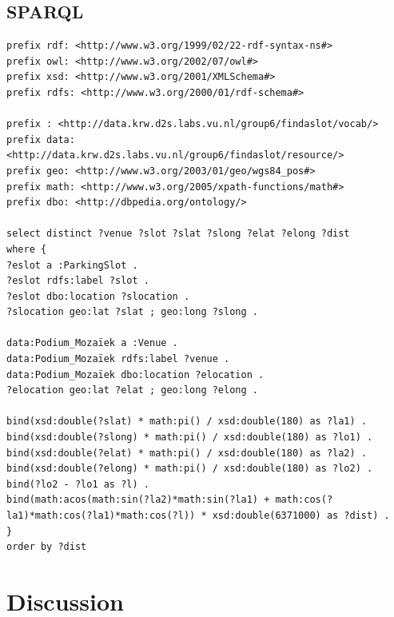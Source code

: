 \documentclass[runningheads,a4paper]{../../StyleFiles/llncs}
\begin{document}

\subsection{SPARQL}

\begin{lstlisting}[captionpos=b, caption=SPARQL query, label=lst:sparql,
basicstyle=\ttfamily,frame=bt]
prefix rdf: <http://www.w3.org/1999/02/22-rdf-syntax-ns#>
prefix owl: <http://www.w3.org/2002/07/owl#>
prefix xsd: <http://www.w3.org/2001/XMLSchema#>
prefix rdfs: <http://www.w3.org/2000/01/rdf-schema#>

prefix : <http://data.krw.d2s.labs.vu.nl/group6/findaslot/vocab/>
prefix data: <http://data.krw.d2s.labs.vu.nl/group6/findaslot/resource/>
prefix geo: <http://www.w3.org/2003/01/geo/wgs84_pos#>
prefix math: <http://www.w3.org/2005/xpath-functions/math#>
prefix dbo: <http://dbpedia.org/ontology/>

select distinct ?venue ?slot ?slat ?slong ?elat ?elong ?dist
where {
?eslot a :ParkingSlot .
?eslot rdfs:label ?slot .
?eslot dbo:location ?slocation .
?slocation geo:lat ?slat ; geo:long ?slong .

data:Podium_Mozaïek a :Venue .
data:Podium_Mozaïek rdfs:label ?venue .
data:Podium_Mozaïek dbo:location ?elocation .
?elocation geo:lat ?elat ; geo:long ?elong .

bind(xsd:double(?slat) * math:pi() / xsd:double(180) as ?la1) .
bind(xsd:double(?slong) * math:pi() / xsd:double(180) as ?lo1) .
bind(xsd:double(?elat) * math:pi() / xsd:double(180) as ?la2) .
bind(xsd:double(?elong) * math:pi() / xsd:double(180) as ?lo2) .
bind(?lo2 - ?lo1 as ?l) .
bind(math:acos(math:sin(?la2)*math:sin(?la1) + math:cos(?la1)*math:cos(?la1)*math:cos(?l)) * xsd:double(6371000) as ?dist) .
}
order by ?dist

\end{lstlisting}




\section{Discussion}



\end{document}
